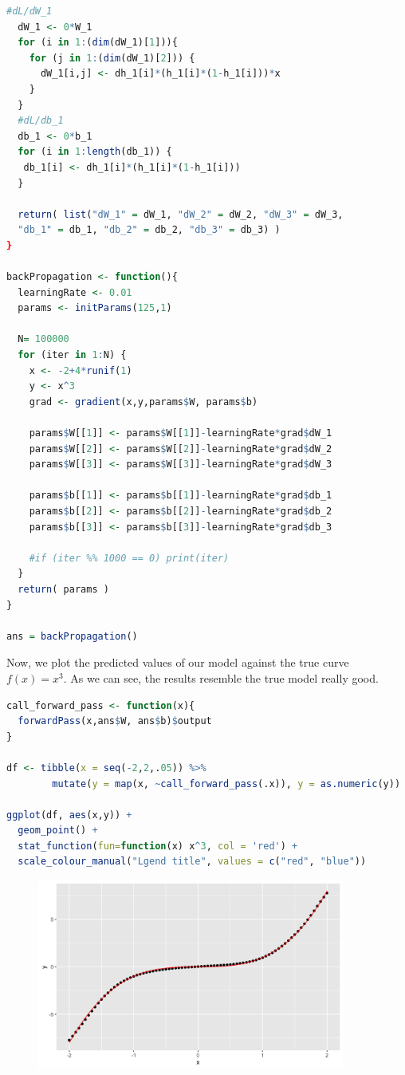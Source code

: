 \begin{lstlisting}[language=R]
  #dL/dW_1
  dW_1 <- 0*W_1
  for (i in 1:(dim(dW_1)[1])){
    for (j in 1:(dim(dW_1)[2])) {
      dW_1[i,j] <- dh_1[i]*(h_1[i]*(1-h_1[i]))*x
    }
  }
  #dL/db_1
  db_1 <- 0*b_1
  for (i in 1:length(db_1)) {
   db_1[i] <- dh_1[i]*(h_1[i]*(1-h_1[i]))
  }

  return( list("dW_1" = dW_1, "dW_2" = dW_2, "dW_3" = dW_3,
  "db_1" = db_1, "db_2" = db_2, "db_3" = db_3) )
}

backPropagation <- function(){
  learningRate <- 0.01
  params <- initParams(125,1)

  N= 100000
  for (iter in 1:N) {
    x <- -2+4*runif(1)
    y <- x^3
    grad <- gradient(x,y,params$W, params$b)

    params$W[[1]] <- params$W[[1]]-learningRate*grad$dW_1
    params$W[[2]] <- params$W[[2]]-learningRate*grad$dW_2
    params$W[[3]] <- params$W[[3]]-learningRate*grad$dW_3

    params$b[[1]] <- params$b[[1]]-learningRate*grad$db_1
    params$b[[2]] <- params$b[[2]]-learningRate*grad$db_2
    params$b[[3]] <- params$b[[3]]-learningRate*grad$db_3

    #if (iter %% 1000 == 0) print(iter)
  }
  return( params )
}

ans = backPropagation()
\end{lstlisting}

Now, we plot the predicted values of our model against the true curve $f(x) = x^3$. As we can see, the results resemble the true model really good.

\begin{lstlisting}[language=R]
call_forward_pass <- function(x){
  forwardPass(x,ans$W, ans$b)$output
}

df <- tibble(x = seq(-2,2,.05)) %>%
        mutate(y = map(x, ~call_forward_pass(.x)), y = as.numeric(y))

ggplot(df, aes(x,y)) +
  geom_point() +
  stat_function(fun=function(x) x^3, col = 'red') +
  scale_colour_manual("Lgend title", values = c("red", "blue"))
\end{lstlisting}

\begin{figure}[H]
    \begin{center}
        \includegraphics[width=0.9\textwidth]{img/img1.jpg}
        \caption{}
    \end{center}
\end{figure}

